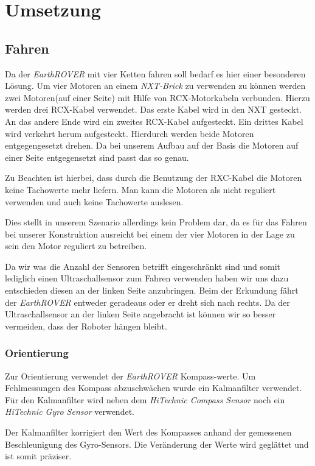 \chapter{Umsetzung}
\section{Fahren}
Da der \textit{EarthROVER} mit vier Ketten fahren soll bedarf es hier einer besonderen Lösung. Um vier Motoren an einem \textit{NXT-Brick} zu verwenden zu können werden zwei Motoren(auf einer Seite) mit Hilfe von RCX-Motorkabeln verbunden. Hierzu werden drei RCX-Kabel verwendet. Das erste Kabel wird in den NXT gesteckt. An das andere Ende wird ein zweites RCX-Kabel aufgesteckt. Ein drittes Kabel wird verkehrt herum aufgesteckt. Hierdurch werden beide Motoren entgegengesetzt drehen. Da bei unserem Aufbau auf der Basis die Motoren auf einer Seite entgegensetzt sind passt das so genau. 


Zu Beachten ist hierbei, dass durch die Benutzung der RXC-Kabel die Motoren keine Tachowerte mehr liefern. Man kann die Motoren als nicht reguliert verwenden und auch keine Tachowerte auslesen.

Dies stellt in unserem Szenario allerdings kein Problem dar, da es für das Fahren bei unserer Konstruktion ausreicht bei einem der vier Motoren in der Lage zu sein den Motor reguliert zu betreiben.

Da wir was die Anzahl der Sensoren betrifft eingeschränkt sind und somit lediglich einen Ultraschallsensor zum Fahren verwenden haben wir uns dazu entschieden diesen an der linken Seite anzubringen. Beim der Erkundung fährt der \textit{EarthROVER} entweder geradeaus oder er dreht sich nach rechts. Da der Ultraschallsensor an der linken Seite angebracht ist können wir so besser vermeiden, dass der Roboter hängen bleibt.

\subsection{Orientierung}
Zur Orientierung verwendet der \textit{EarthROVER} Kompass-werte. Um Fehlmessungen des Kompass abzuschwächen wurde ein Kalmanfilter verwendet. Für den Kalmanfilter wird neben dem \textit{HiTechnic Compass Sensor} noch ein \textit{HiTechnic Gyro Sensor} verwendet.

Der Kalmanfilter korrigiert den Wert des Kompasses anhand der gemessenen Beschleunigung des Gyro-Sensors. Die Veränderung der Werte wird geglättet und ist somit präziser.

